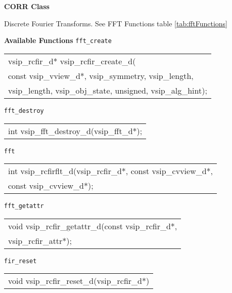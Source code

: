 \clearpage
{\large \textbf{\hypertarget{corrFunc}{CORR Class}}}\vspace{.2cm}\\
\hspace*{.3cm}
\parbox{0.85\textwidth}{Discrete Fourier Transforms. See FFT Functions table \ref{tab:fftFunctions}}
\cvsiplh 
\newline \hspace*{.8cm} \vspace*{.1cm} \textbf{Available Functions }
\newline \hspace*{.8cm} \vspace*{.1cm} \texttt{fft\_create}
\newline \hspace*{1.1cm} {
\ttfamily
\begin{tabular}[H]{l}
vsip\_rcfir\_d* vsip\_rcfir\_create\_d(\\*\hspace{.7cm}const vsip\_vview\_d*, vsip\_symmetry, vsip\_length,\\*\hspace{.7cm}vsip\_length, vsip\_obj\_state, unsigned, vsip\_alg\_hint);\\
\end{tabular}
}
\newline \hspace*{.8cm} \vspace*{.1cm} \texttt{fft\_destroy}
\newline \hspace*{1.1cm} {
\ttfamily
\begin{tabular}[H]{l}
int vsip\_fft\_destroy\_d(vsip\_fft\_d*);\\
\end{tabular}
}\vspace{.1cm}
\newline \hspace*{.8cm} \vspace*{.1cm} \texttt{fft}
\newline \hspace*{1.1cm} {
\ttfamily
\begin{tabular}[H]{l}
int vsip\_rcfirflt\_d(vsip\_rcfir\_d*, const vsip\_cvview\_d*,\\*\hspace{.7cm}const vsip\_cvview\_d*);\\
\end{tabular}
}
\clearpage
\hspace*{.8cm} \texttt{fft\_getattr}
\newline \hspace*{1.1cm} {
\ttfamily
\begin{tabular}[H]{l}
void vsip\_rcfir\_getattr\_d(const vsip\_rcfir\_d*,\\*\hspace{.7cm}vsip\_rcfir\_attr*);\\
\end{tabular}
}\vspace{.1cm}
\newline\hspace*{.8cm} \texttt{fir\_reset}
\newline \hspace*{1.1cm} {
\ttfamily
\begin{tabular}[H]{l}
void vsip\_rcfir\_reset\_d(vsip\_rcfir\_d*)\\
\end{tabular}\
}
\pyjvsiph